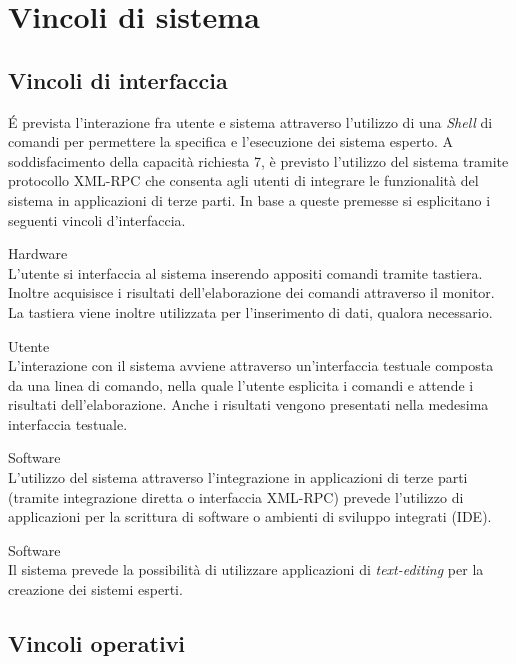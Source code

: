 \section{Vincoli di sistema}
\vincoliinit
\subsection{Vincoli di interfaccia}

\'E prevista l'interazione fra utente e sistema attraverso l'utilizzo di una \emph{Shell} di comandi per permettere la specifica e l'esecuzione dei sistema esperto.  A soddisfacimento della capacità richiesta 7, è previsto l'utilizzo del sistema tramite protocollo XML-RPC che consenta agli utenti di integrare le funzionalità del sistema in applicazioni di terze parti. In base a queste premesse si esplicitano i seguenti vincoli d'interfaccia.
\vincolistart
	\item Hardware\\	
	L'utente si interfaccia al sistema inserendo appositi comandi tramite tastiera. Inoltre acquisisce i risultati dell'elaborazione dei comandi attraverso il monitor. La tastiera viene inoltre utilizzata per l'inserimento di dati, qualora necessario.
	
	\item Utente\\
	L'interazione con il sistema avviene attraverso un'interfaccia testuale composta da una linea di comando, nella quale l'utente esplicita i comandi e attende i risultati dell'elaborazione. Anche i risultati vengono presentati nella medesima interfaccia testuale.
	
	\item Software\\
	L'utilizzo del sistema attraverso l'integrazione in applicazioni di terze parti (tramite integrazione diretta o interfaccia XML-RPC) prevede l'utilizzo di applicazioni per la scrittura di software o ambienti di sviluppo integrati (IDE).
	
	\item Software\\
	Il sistema prevede la possibilità di utilizzare applicazioni di \emph{text-editing} per la creazione dei sistemi esperti.
	
\vincoliend

\subsection{Vincoli operativi}

